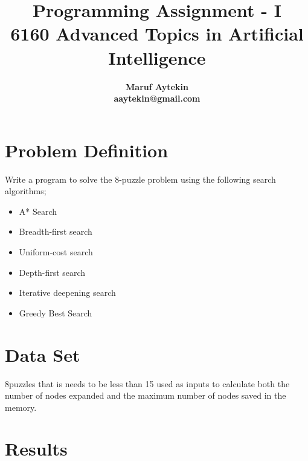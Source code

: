\documentclass{article}
\title {Programming Assignment - I \\6160 Advanced Topics in Artificial Intelligence}
\author{\bf Maruf Aytekin \\
aaytekin@gmail.com}
\begin{document}
\maketitle

\section{Problem Definition}

Write a program to solve the 8-puzzle problem using the following search algorithms;
\begin{itemize}
  \item A* Search
  \item Breadth-first search
  \item Uniform-cost search
  \item Depth-first search
  \item Iterative deepening search
  \item Greedy Best Search
\end{itemize}

\section{Data Set}
8puzzles that is needs to be less than 15 used as inputs to calculate both the number of nodes expanded and the maximum number of nodes saved in the memory.

\section{Results}
\end{document}
